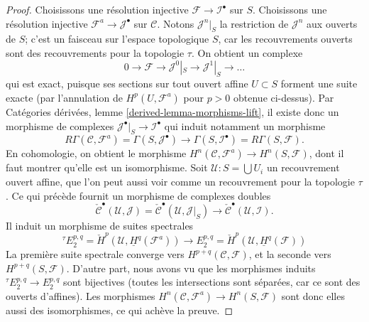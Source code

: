 \begin{proof}
\medskip\noindent
Choisissons une résolution injective
$\mathcal{F} \to \mathcal{I}^\bullet$ sur $S$. Choisissons une
résolution injective $\mathcal{F}^a \to \mathcal{J}^\bullet$
sur $\mathcal{C}$.
Notons $\mathcal{J}^n|_S$ la restriction de $\mathcal{J}^n$ aux ouverts
de $S$; c'est un faisceau sur l'espace topologique $S$, car les
recouvrements ouverts sont des recouvrements pour la topologie $\tau$. On obtient un
complexe
$$
0 \to \mathcal{F} \to \mathcal{J}^0|_S \to \mathcal{J}^1|_S \to \ldots
$$
qui est exact, puisque ses sections sur tout ouvert affine $U \subset S$
forment une suite exacte (par l'annulation de
$H^p(U, \mathcal{F}^a)$ pour $p > 0$ obtenue ci-dessus). Par Catégories
dérivées, lemme \ref{derived-lemma-morphisms-lift}, il existe donc un
morphisme de complexes
$\mathcal{J}^\bullet|_S \to \mathcal{I}^\bullet$ qui induit notamment
un morphisme
$$
R\Gamma(\mathcal{C}, \mathcal{F}^a)
=
\Gamma(S, \mathcal{J}^\bullet)
\longrightarrow
\Gamma(S, \mathcal{I}^\bullet)
=
R\Gamma(S, \mathcal{F}).
$$
En cohomologie, on obtient le morphisme
$H^n(\mathcal{C}, \mathcal{F}^a) \to H^n(S, \mathcal{F})$, dont il faut
montrer qu'elle est un isomorphisme. Soit
$\mathcal{U} : S = \bigcup U_i$ un recouvrement ouvert affine, que l'on
peut aussi voir comme un recouvrement pour la topologie $\tau$. Ce qui précède fournit un
morphisme de complexes doubles
$$
\check{\mathcal{C}}^\bullet(\mathcal{U}, \mathcal{J})
=
\check{\mathcal{C}}^\bullet(\mathcal{U}, \mathcal{J}|_S)
\longrightarrow
\check{\mathcal{C}}^\bullet(\mathcal{U}, \mathcal{I}).
$$
Il induit un morphisme de suites spectrales
$$
{}^\tau\! E_2^{p, q} = \check{H}^p(\mathcal{U}, \underline{H}^q(\mathcal{F}^a))
\longrightarrow
E_2^{p, q} = \check{H}^p(\mathcal{U}, \underline{H}^q(\mathcal{F}))
$$
La première suite spectrale converge vers
$H^{p + q}(\mathcal{C}, \mathcal{F})$, et la seconde vers
$H^{p + q}(S, \mathcal{F})$. D'autre part, nous avons vu que les
morphismes induits ${}^\tau\! E_2^{p, q} \to E_2^{p, q}$ sont
bijectives (toutes les intersections sont séparées, car ce sont des
ouverts d'affines). Les morphismes
$H^n(\mathcal{C}, \mathcal{F}^a) \to H^n(S, \mathcal{F})$ sont donc elles
aussi des isomorphismes, ce qui achève la preuve.
\end{proof}

